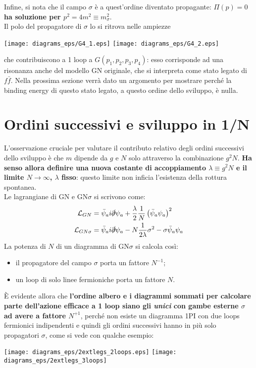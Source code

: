 \documentclass[a4paper,11pt]{amsart}
\newcommand{\nl}{\vskip 0.3cm}
\newcommand{\np}{\vskip 1.3cm}
\newcommand{\psibar}{\bar{\psi}}
\newcommand{\ssection}[2]{\section{ \texorpdfstring{\textbf{#1}}{#2} }}
\begin{document}
Infine, si nota che il campo $\sigma$ è a quest'ordine diventato propagante: \textbf{$\Pi(p)=0$ ha soluzione per $p^2 = 4m^2 \equiv m_{\sigma}^2$}.\\
Il polo del propagatore di $\sigma$ lo si ritrova nelle ampiezze 
\begin{center}
\texttt{[image: diagrams\_eps/G4\_1.eps]} \hspace{0.05\paperwidth} \hspace{0.05\paperwidth}  \texttt{[image: diagrams\_eps/G4\_2.eps]} 
\end{center}
che contribuiscono a 1 loop a $G(p_1,p_2,p_3,p_4)$: esso corrisponde ad una risonanza anche del modello GN originale, che si interpreta come stato legato di $f\bar{f}$.                                                                    
Nella prossima sezione verrà dato un argomento per mostrare perché la binding energy di questo stato legato, a questo ordine dello sviluppo, è nulla.
\np

\ssection{Ordini successivi e sviluppo in 1/N}{Sviluppo}
L'osservazione cruciale per valutare il contributo relativo degli ordini successivi dello sviluppo è che $m$ dipende da $g$ e $N$ solo attraverso la combinazione $g^2N$. \textbf{Ha senso allora definire una nuova costante di accoppiamento $\lambda \equiv g^2N$ e il limite $N \to \infty$, $\lambda$ fisso}: questo limite non inficia l'esistenza della rottura spontanea.\\
Le lagrangiane di GN e GN$\sigma$ si scrivono come:
\begin{align*}
 \mathcal{L}_{GN}& = \psibar_a i\slashed{\partial}\psi_a + \frac{\lambda}{2}\frac{1}{N}\left(\psibar_a\psi_a\right)^2\\
 \mathcal{L}_{GN\sigma}& = \psibar_a i\slashed{\partial}\psi_a - N\frac{1}{2\lambda}\sigma^2 - \sigma\psibar_a\psi_a
\end{align*}
La potenza di $N$ di un diagramma di GN$\sigma$ si calcola così:
\begin{itemize} 
\item il propagatore del campo $\sigma$ porta un fattore $N^{-1}$;
\item un loop di solo linee fermioniche porta un fattore $N$.
\end{itemize}
\nl

È evidente allora che \textbf{l'ordine albero e i diagrammi sommati per calcolare parte dell'azione efficace a 1 loop 
siano gli \emph{unici} con gambe esterne $\sigma$ ad avere a fattore $N^{+1}$}, perché non esiste un diagramma 1PI con due loops fermionici indipendenti e quindi gli ordini successivi hanno in più solo propagatori $\sigma$, come si vede con qualche esempio:\\
\begin{center}
 \texttt{[image: diagrams\_eps/2extlegs\_2loops.eps]} \hspace{0.07\paperwidth} \texttt{[image: diagrams\_eps/2extlegs\_3loops]}
\end{center}
\end{document}
